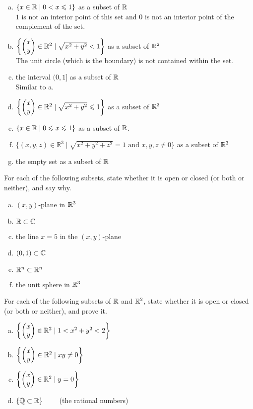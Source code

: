 \begin{enumerate}[a.]
	\item $\left\{ x\in \mathbb{R} \mid 0<x \leqslant 1 \right\}$ as a subset of $\mathbb{R}$ \\
	 $1$ is not an interior point of this set and $0$ is not an interior point of the complement of the set.
	\item $\left\{ \begin{pmatrix} x \\ y \end{pmatrix}\in \mathbb{R}^2 \mid \sqrt{x^2+y^2}< 1 \right\}$ as a subset of $\mathbb{R}^2$ \\
	 The unit circle (which is the boundary) is not contained within the set.
	\item the interval $(0,1]$ as a subset of $\mathbb{R}$ \\
	 Similar to a.
	\item $\left\{ \begin{pmatrix} x \\ y \end{pmatrix}\in \mathbb{R}^2 \mid \sqrt{x^2+y^2}\leqslant 1 \right\}$ as a subset of $\mathbb{R}^2$ \\
	\item $\{x\in\mathbb{R}\mid 0\leqslant x\leqslant 1\}$ as a subset of $\mathbb{R}$.
	\item $\{(x,y,z)\in\mathbb R^3 \mid \sqrt{x^2+y^2+z^2}=1 \text{ and }x,y,z\neq 0\}$ as a subset of $\mathbb{R}^3$
  \item the empty set as a subset of $\mathbb{R}$

\end{enumerate}


For each of the following subsets, state whether it is open or closed (or both or neither), and say why.
\begin{enumerate}[a.]
\item $(x,y)$-plane in $\mathbb{R}^3$
\item $\mathbb{R}\subset \mathbb{C}$
\item the line $x=5$ in the $(x,y)$-plane
\item $(0,1)\subset \mathbb{C}$
\item $\mathbb{R}^n\subset \mathbb{R}^n$
\item the unit sphere in $\mathbb{R}^3$
\end{enumerate}

For each of the following subsets of $\mathbb{R}$ and $\mathbb{R}^2$, state whether it is open or closed (or both or neither), and prove it.
\begin{enumerate}[a.]
	\item $\left\{ \begin{pmatrix} x \\ y \end{pmatrix} \in \mathbb{R}^2 \mid 1 < x^2+y^2 < 2 \right\}$ \\
	\item $\left\{ \begin{pmatrix} x \\ y \end{pmatrix} \in \mathbb{R}^2 \mid xy\neq 0 \right\}$ \\
	\item $\left\{ \begin{pmatrix} x \\ y \end{pmatrix} \in \mathbb{R}^2 \mid y=0 \right\}$
	\item $\left\{ \mathbb{Q} \subset \mathbb{R} \right\}\qquad$ (the rational numbers)
\end{enumerate}
